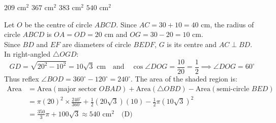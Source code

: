\begin{minipage}{0.45\textwidth}
\begin{choices}
    \choice $209\text{ cm}^2$
    \choice $367\text{ cm}^2$
    \choice $383\text{ cm}^2$
    \correctchoice $540\text{ cm}^2$
\end{choices}
\end{minipage}
\begin{minipage}{0.52\textwidth}
\centering
{}
\end{minipage}
\begin{solution}
Let $O$ be the centre of circle $ABCD$. Since $AC = 30 + 10 = 40\text{ cm}$, the radius of circle $ABCD$ is $OA = OD = 20\text{ cm}$ and $OG = 30 - 20 = 10\text{ cm}$. \\
Since $BD$ and $EF$ are diameters of circle $BEDF$, $G$ is its centre and $AC \perp BD$. In right-angled $\triangle OGD$:
\[ GD = \sqrt{20^2 - 10^2} = 10\sqrt{3}\text{ cm} \quad \text{and} \quad \cos\angle DOG = \frac{10}{20} = \frac{1}{2} \implies \angle DOG = 60^\circ \]
Thus reflex $\angle BOD = 360^\circ - 120^\circ = 240^\circ$. The area of the shaded region is:
\begin{align*}
\text{Area} &= \text{Area}(\text{major sector } OBAD) + \text{Area}(\triangle OBD) - \text{Area}(\text{semi-circle } BED) \\
&= \pi(20)^2 \times \frac{240^\circ}{360^\circ} + \frac{1}{2}(20\sqrt{3})(10) - \frac{1}{2}\pi(10\sqrt{3})^2 \\
&= \frac{350}{3}\pi + 100\sqrt{3} \approx 540\text{ cm}^2 \quad \text{(D)}
\end{align*}
\end{solution}

